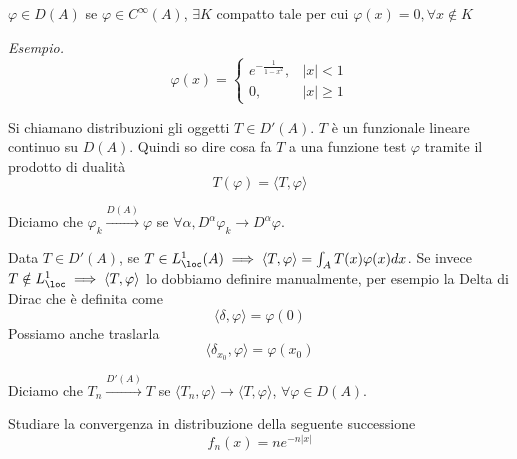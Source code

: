 \begin{defn}
 $\varphi \in D(A)$ se $\varphi \in C^{\infty}(A)$, $\exists K$ compatto tale per cui $\varphi (x) = 0, \forall x\notin K$
\end{defn}
\textit{Esempio.}
\begin{equation*}
\varphi (x) =
\begin{cases}
e^{- \frac{1}{1 - x^{2}}}, & | x| < 1\\
0, & | x| \geq 1
\end{cases}
\end{equation*}
\begin{defn}
[Distribuzione] Si chiamano distribuzioni gli oggetti $T\in D'(A)$. $T$ è un funzionale lineare continuo su $D(A)$. Quindi so dire cosa fa $T$ a una funzione test $\varphi $ tramite il prodotto di dualità
\begin{equation*}
T(\varphi) = \langle T, \varphi \rangle
\end{equation*}
\end{defn}
\begin{defn}
 Diciamo che $\varphi_{k}\xrightarrow{D(A)} \varphi $ se $\forall \alpha, D^{\alpha} \varphi_{k}\rightarrow D^{\alpha} \varphi $.
\end{defn}
\begin{defn}
 Data $T\in D'(A)$, se $T\in L^{1}_{\loc}(A) \implies \langle T, \varphi \rangle = \int_{A} T(x) \varphi (x) dx$. Se invece $T\notin L^{1}_{\loc} \implies \langle T, \varphi \rangle $ lo dobbiamo definire manualmente, per esempio la Delta di Dirac che è definita come
\begin{equation*}
\langle \delta, \varphi \rangle = \varphi (0)
\end{equation*}
Possiamo anche traslarla
\begin{equation*}
\langle \delta_{x_{0}}, \varphi \rangle = \varphi (x_{0})
\end{equation*}
\end{defn}
\begin{defn}
 Diciamo che $T_{n}\xrightarrow{D'(A)} T$ se $\langle T_{n}, \varphi \rangle \rightarrow \langle T, \varphi \rangle $, $\forall \varphi \in D(A)$.
\end{defn}
Studiare la convergenza in distribuzione della seguente successione
\begin{equation*}
f_{n} (x) = ne^{- n|x|}
\end{equation*}

